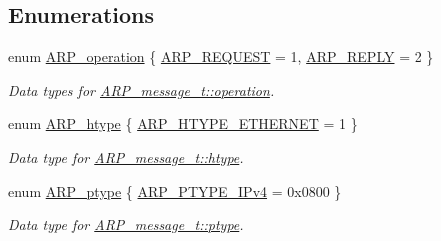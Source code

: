 \subsection*{Enumerations}
\begin{DoxyCompactItemize}
\item 
enum \mbox{\hyperlink{group__arp_ga403f6527e9ff615efd0c8ed05790fde3}{A\+R\+P\+\_\+operation}} \{ \mbox{\hyperlink{group__arp_gga403f6527e9ff615efd0c8ed05790fde3afb58ccf8b7b11505ff2117a10bf6ff61}{A\+R\+P\+\_\+\+R\+E\+Q\+U\+E\+ST}} = 1, 
\mbox{\hyperlink{group__arp_gga403f6527e9ff615efd0c8ed05790fde3a8bb24a026264a5b22435864179f874d9}{A\+R\+P\+\_\+\+R\+E\+P\+LY}} = 2
 \}
\begin{DoxyCompactList}\small\item\em Data types for \mbox{\hyperlink{struct_a_r_p__message_ad21c763fa2f80cb8649108b759113b54}{A\+R\+P\+\_\+message\+\_\+t\+::operation}}. \end{DoxyCompactList}\item 
enum \mbox{\hyperlink{group__arp_gad603463074b00d9c86a9cdb23083f37d}{A\+R\+P\+\_\+htype}} \{ \mbox{\hyperlink{group__arp_ggad603463074b00d9c86a9cdb23083f37da832f2b0d1c3af55f4a4bbe2aa90da148}{A\+R\+P\+\_\+\+H\+T\+Y\+P\+E\+\_\+\+E\+T\+H\+E\+R\+N\+ET}} = 1
 \}
\begin{DoxyCompactList}\small\item\em Data type for \mbox{\hyperlink{struct_a_r_p__message_aaf87c38602b614bc7896cf7a5a90d372}{A\+R\+P\+\_\+message\+\_\+t\+::htype}}. \end{DoxyCompactList}\item 
enum \mbox{\hyperlink{group__arp_gaeae5f5d6313cd707dd97fa24dbab569c}{A\+R\+P\+\_\+ptype}} \{ \mbox{\hyperlink{group__arp_ggaeae5f5d6313cd707dd97fa24dbab569cada8f134c523d1516f6a63d6d475c7bd8}{A\+R\+P\+\_\+\+P\+T\+Y\+P\+E\+\_\+\+I\+Pv4}} = 0x0800
 \}
\begin{DoxyCompactList}\small\item\em Data type for \mbox{\hyperlink{struct_a_r_p__message_ab4891e9b77eb26f33d21cfde982564cb}{A\+R\+P\+\_\+message\+\_\+t\+::ptype}}. \end{DoxyCompactList}\end{DoxyCompactItemize}
